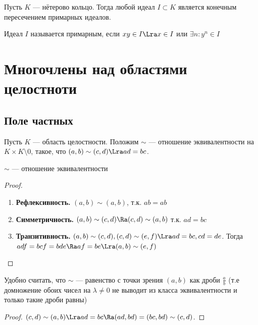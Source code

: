 \begin{theorem}
    Пусть \(K\) --- нётерово кольцо. Тогда любой идеал \(I \subset K\) является конечным пересечением примарных идеалов.
\end{theorem}

\begin{definition}
    Идеал \(I\) называется примарным, если \(xy \in I \Lra x \in I\) или \(\exists n: y^n \in I\)
\end{definition}

\section{Многочлены над областями целостноти}
\subsection{Поле частных}

\begin{definition}
    Пусть \(K\) --- область целостности. Положим \(\sim\) --- отношение эквивалентности на \(K \times K \setminus 0\), такое, что \((a, b) \sim (c, d) \Lra ad = bc\).
\end{definition}

\begin{proposition}
    \(\sim\) --- отношение эквивалентности
\end{proposition}
\begin{proof}
    \begin{enumerate}
        \item \textbf{Рефлексивность.} \((a, b) \sim (a, b)\), т.к. \(ab = ab\)
        \item \textbf{Симметричность.} \((a, b) \sim (c, d) \Ra (c, d) \sim (a, b)\) т.к. \(ad = bc\)
        \item \textbf{Транзитивность.} \((a, b) \sim (c, d), (c, d) \sim (e, f) \Lra ad = bc, cd = de\). Тогда \(adf = bcf = bde \Ra af = be \Lra (a, b) \sim (e, f)\)
    \end{enumerate}
\end{proof}

\begin{note}
    Удобно считать, что \(\sim\) --- равенство с точки зрения \((a, b)\) как дроби \(\frac{a}{b}\) (т.е домножение обоих чисел на \(\lambda \ne 0\) не выводит из класса эквивалентности и только такие дроби равны) 
\end{note}
\begin{proof}
    \((c, d) \sim (a, b) \Lra ad = bc \Ra (ad, bd) = (bc, bd) \sim (c, d)\).
\end{proof}

